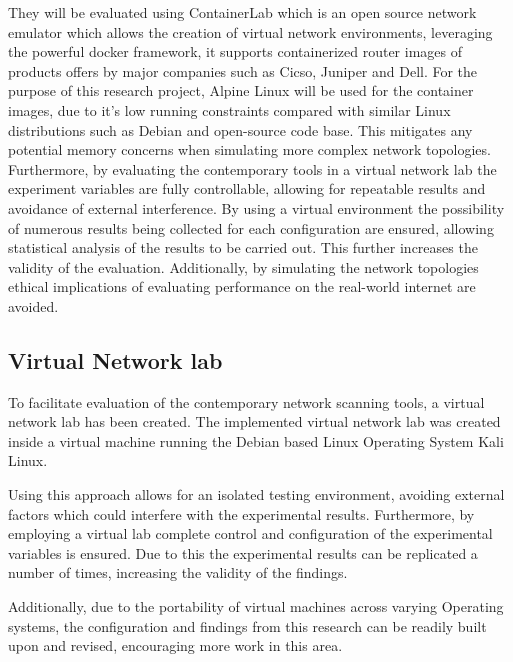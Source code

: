 They will be evaluated using ContainerLab \cite{containerlab} which is an open source network emulator which allows the creation of virtual network environments, leveraging the powerful docker framework, it supports containerized router images of products offers by major companies such as Cicso, Juniper and Dell. For the purpose of this research project, Alpine Linux will be used for the container images, due to it's low running constraints compared with similar Linux distributions such as Debian\cite{alpine} and open-source code base. This mitigates any potential memory concerns when simulating more complex network topologies. Furthermore, by evaluating the contemporary tools in a virtual network lab the experiment variables are fully controllable, allowing for repeatable results and avoidance of external interference. By using a virtual environment the possibility of numerous results being collected for each configuration are ensured, allowing statistical analysis of the results to be carried out. This further increases the validity of the evaluation. Additionally, by simulating the network topologies ethical implications of evaluating performance on the real-world internet are avoided. 



\subsection{Virtual Network lab}
To facilitate evaluation of the contemporary network scanning tools, a virtual network lab has been created. The implemented virtual network lab was created inside a virtual machine running the Debian based Linux Operating System  Kali Linux. 

Using this approach allows for an isolated testing environment, avoiding external factors which could interfere with the experimental results. Furthermore, by employing a virtual lab complete control and configuration of the experimental variables is ensured. Due to this the experimental results can be replicated a number of times, increasing the validity of the findings. 

Additionally, due to the portability of virtual machines across varying Operating systems, the configuration and findings from this research can be readily built upon and revised, encouraging more work in this area.

